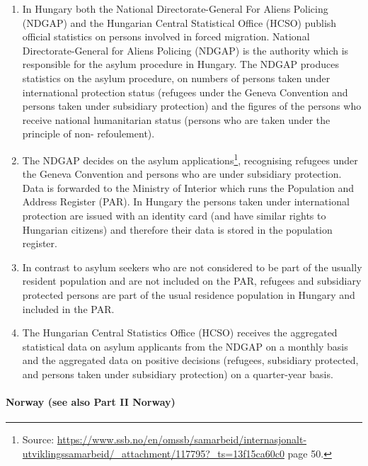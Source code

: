 \documentclass[
]{article}
\begin{document}
\begin{enumerate}
\def\labelenumi{\arabic{enumi}.}
\setcounter{enumi}{158}
\item
  In Hungary both the National Directorate-General For Aliens
  Policing (NDGAP) and the Hungarian Central Statistical Office (HCSO)
  publish official statistics on persons involved in forced migration.
  National Directorate-General for Aliens Policing (NDGAP) is the
  authority which is responsible for the asylum procedure in Hungary.
  The NDGAP produces statistics on the asylum procedure, on numbers of
  persons taken under international protection status (refugees under
  the Geneva Convention and persons taken under subsidiary protection)
  and the figures of the persons who receive national humanitarian
  status (persons who are taken under the principle of non-
  refoulement).
\item
  The NDGAP decides on the asylum applications\footnote{Source:
    \url{https://www.ssb.no/en/omssb/samarbeid/internasjonalt-utviklingssamarbeid/_attachment/117795?_ts=13f15ca60c0}
    page 50.}, recognising
  refugees under the Geneva Convention and persons who are under
  subsidiary protection. Data is forwarded to the Ministry of Interior
  which runs the Population and Address Register (PAR). In Hungary the
  persons taken under international protection are issued with an
  identity card (and have similar rights to Hungarian citizens) and
  therefore their data is stored in the population register.
\item
  In contrast to asylum seekers who are not considered to be part of
  the usually resident population and are not included on the PAR,
  refugees and subsidiary protected persons are part of the usual
  residence population in Hungary and included in the PAR.
\item
  The Hungarian Central Statistics Office (HCSO) receives the
  aggregated statistical data on asylum applicants from the NDGAP on a
  monthly basis and the aggregated data on positive decisions
  (refugees, subsidiary protected, and persons taken under subsidiary
  protection) on a quarter-year basis.
\end{enumerate}

\hypertarget{norway-see-also-part-ii-norway-1}{%
\paragraph{Norway (see also Part II Norway)}\label{norway-see-also-part-ii-norway-1}}
\end{document}
